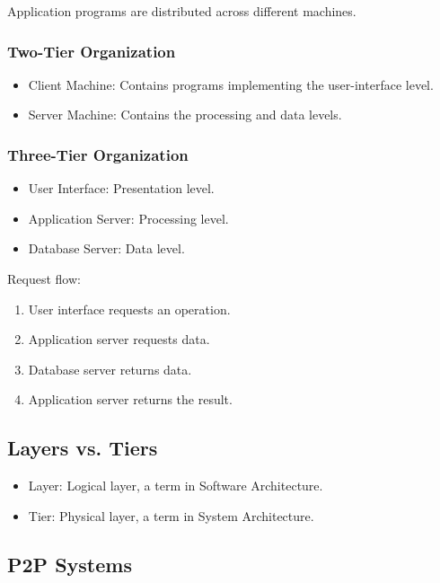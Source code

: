 \documentclass{article}
\begin{document}
Application programs are distributed across different machines.

\subsubsection{Two-Tier Organization}

\begin{itemize}
    \item Client Machine: Contains programs implementing the user-interface level.
    \item Server Machine: Contains the processing and data levels.
\end{itemize}

\subsubsection{Three-Tier Organization}

\begin{itemize}
    \item User Interface: Presentation level.
    \item Application Server: Processing level.
    \item Database Server: Data level.
\end{itemize}

Request flow:

\begin{enumerate}
    \item User interface requests an operation.
    \item Application server requests data.
    \item Database server returns data.
    \item Application server returns the result.
\end{enumerate}

\subsection{Layers vs. Tiers}

\begin{itemize}
    \item Layer: Logical layer, a term in Software Architecture.
    \item Tier: Physical layer, a term in System Architecture.
\end{itemize}

\subsection{P2P Systems}
\end{document}
